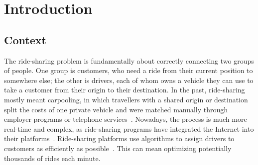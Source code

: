 \section{Introduction}

\subsection{Context}

The ride-sharing problem is fundamentally about correctly connecting two groups of people. One group is customers, who need a ride from their current position to somewhere else; the other is drivers, each of whom owns a vehicle they can use to take a customer from their origin to their destination. In the past, ride-sharing mostly meant carpooling, in which travellers with a shared origin or destination split the costs of one private vehicle and were matched manually through employer programs or telephone services~\citep{chan2012ridesharing}. Nowadays, the process is much more real-time and complex, as ride-sharing programs have integrated the Internet into their platforms~\citep{chan2012ridesharing}. Ride-sharing platforms use algorithms to assign drivers to customers as efficiently as possible~\citep{agatz2012optimization}. This can mean optimizing potentially thousands of rides each minute.

